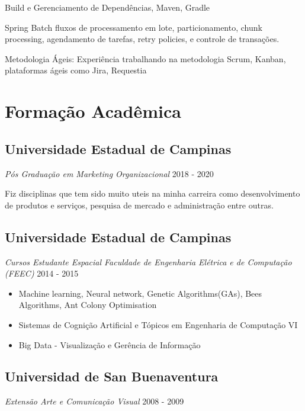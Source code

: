 \documentclass[a4paper,10pt]{article}
\begin{document}
Build e Gerenciamento de Dependências, Maven, Gradle

Spring Batch
fluxos de processamento em lote,
particionamento,
chunk processing,
agendamento de tarefas, retry policies,
e controle de transações.

\textcolor{corSubSection}{Metodologia Ágeis:}
Experiência trabalhando na metodologia Scrum, Kanban, plataformas ágeis como Jira, Requestia


\clearpage
\section*{Formação Acadêmica}
\noindent\makebox[\linewidth]{\rule{\linewidth}{0.1mm}\textcolor{corLarge}{}}

\subsection*{Universidade Estadual de Campinas}
\textcolor{corSubSection}{\emph{Pós Graduação em Marketing Organizacional}}
\hfill \textcolor{corSubSection}{2018 - 2020}

Fiz disciplinas que tem sido muito uteis na minha carreira como
desenvolvimento de produtos e serviços,
pesquisa de mercado e administração entre outras.

\subsection*{Universidade Estadual de Campinas}
\textcolor{corSubSection}{\emph{Cursos Estudante Espacial Faculdade de Engenharia Elétrica e de Computação (FEEC)}}
\hfill \textcolor{corSubSection}{2014 - 2015}

\begin{itemize}
    \item Machine learning, Neural network, Genetic Algorithms(GAs), Bees Algorithms, Ant Colony Optimisation
    \item Sistemas de Cognição Artificial e Tópicos em Engenharia de Computação VI
    \item Big Data - Visualização e Gerência de Informação
\end{itemize}

\subsection*{Universidad de San Buenaventura}
\textcolor{corSubSection}{\emph{Extensão Arte e Comunicação Visual}}
\hfill \textcolor{corSubSection}{2008 - 2009}
\end{document}
